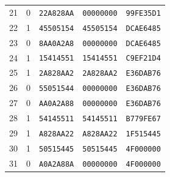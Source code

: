 \begin{longtable}{rrlll}
21 & 0 & \texttt{22A828AA} & \texttt{00000000} & \texttt{99FE35D1}\\
22 & 1 & \texttt{45505154} & \texttt{45505154} & \texttt{DCAE6485}\\
23 & 0 & \texttt{8AA0A2A8} & \texttt{00000000} & \texttt{DCAE6485}\\
24 & 1 & \texttt{15414551} & \texttt{15414551} & \texttt{C9EF21D4}\\
25 & 1 & \texttt{2A828AA2} & \texttt{2A828AA2} & \texttt{E36DAB76}\\
26 & 0 & \texttt{55051544} & \texttt{00000000} & \texttt{E36DAB76}\\
27 & 0 & \texttt{AA0A2A88} & \texttt{00000000} & \texttt{E36DAB76}\\
28 & 1 & \texttt{54145511} & \texttt{54145511} & \texttt{B779FE67}\\
29 & 1 & \texttt{A828AA22} & \texttt{A828AA22} & \texttt{1F515445}\\
30 & 1 & \texttt{50515445} & \texttt{50515445} & \texttt{4F000000}\\
31 & 0 & \texttt{A0A2A88A} & \texttt{00000000} & \texttt{4F000000}\\
\bottomrule
\end{longtable}
\endgroup
